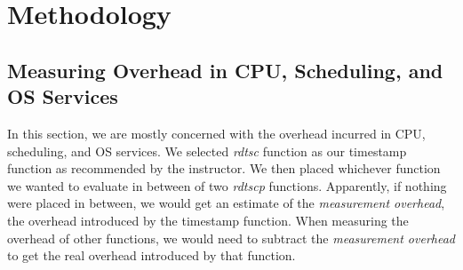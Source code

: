 \section{Methodology}
\subsection{Measuring Overhead in CPU, Scheduling, and OS Services}
In this section, we are mostly concerned with the overhead incurred in CPU, scheduling, and OS services. 
We selected \textit{rdtsc} function as our timestamp function as recommended by the instructor.
We then placed whichever function we wanted to evaluate in between of two \textit{rdtscp} functions.
Apparently, if nothing were placed in between, we would get an estimate of the \textit{measurement overhead}, 
the overhead introduced by the timestamp function.
When measuring the overhead of other functions, we would need to subtract the \textit{measurement overhead} to get the real overhead introduced by that function.